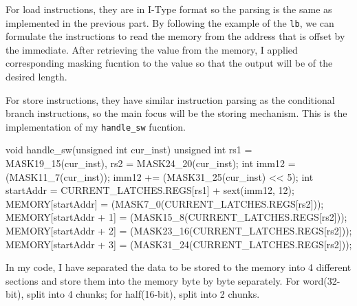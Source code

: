 \documentclass[12pt, a4paper]{article}
\begin{document}
\begin{ans}
For load instructions, they are in I-Type format so the parsing is the same as implemented in the previous part. 
By following the example of the \texttt{lb}, we can formulate the instructions to read the memory from the address that is offset by the immediate. 
After retrieving the value from the memory, I applied corresponding masking fucntion to the value so that the output will be of the desired length. 

For store instructions, they have similar instruction parsing as the conditional branch instructions, so the main focus will be the storing mechanism. 
This is the implementation of my \texttt{handle\_sw} fucntion. 

\begin{code}
void handle_sw(unsigned int cur_inst) {
    unsigned int rs1 = MASK19_15(cur_inst), rs2 = MASK24_20(cur_inst);
    int imm12 = (MASK11_7(cur_inst));
    imm12 += (MASK31_25(cur_inst) << 5);
    int startAddr = CURRENT_LATCHES.REGS[rs1] + sext(imm12, 12);
    MEMORY[startAddr] = (MASK7_0(CURRENT_LATCHES.REGS[rs2]));
    MEMORY[startAddr + 1] = (MASK15_8(CURRENT_LATCHES.REGS[rs2]));
    MEMORY[startAddr + 2] = (MASK23_16(CURRENT_LATCHES.REGS[rs2]));
    MEMORY[startAddr + 3] = (MASK31_24(CURRENT_LATCHES.REGS[rs2]));
}
\end{code}
In my code, I have separated the data to be stored to the memory into 4 different sections and store 
them into the memory byte by byte separately. For word(32-bit), split into 4 chunks; for half(16-bit), split into 2 chunks. 

\end{ans}
\pagebreak
\end{document}
